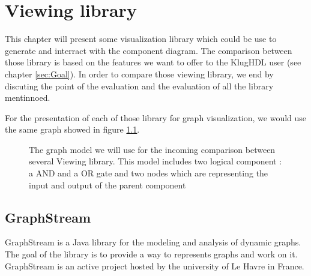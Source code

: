 \chapter{Viewing library} %
\label{cha:Viewing library}

This chapter will present some visualization library which could be use to generate and interract with the component diagram. The comparison between those library is based on the features we want to offer to the KlugHDL user (see chapter \ref{sec:Goal}). In order to compare those viewing library, we end by discuting the point of the evaluation and the evaluation of all the library mentinnoed.

For the presentation of each of those library for graph visualization, we would use the same graph showed in figure \ref{fig:graph-base-model}.

\begin{figure}[h] %
    \centering
    \caption[Graph model for the viewing library comparison]
    {The graph model we will use for the incoming comparison
    between several Viewing library. This model includes two logical component : a AND and a OR gate and two nodes
    which are representing the input and output of the parent component}
    \label{fig:graph-base-model}
\end{figure} %

\section{GraphStream} %
\label{sec:Graphstream}

GraphStream is a Java library for the modeling and analysis of dynamic graphs\cite{graphstream}. The goal of the library is to provide a way to represents graphs and work on it\cite{graphstream}. GraphStream is an active project hosted by the university of Le Havre in France.

